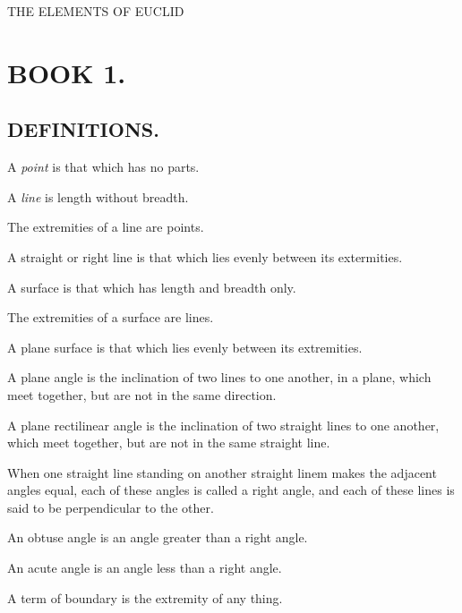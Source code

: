 		{
		\cleardoublepage%
		\let\clearpage\relax%
		{\hspace{48pt}\centering THE ELEMENTS OF EUCLID}%
		
		\chapter{BOOK 1.}\label{book1}
		}
		\pagestyle{euclidbasic}
		{\centering\section{DEFINITIONS.}
		\label{section\thesection}
		}
		\begin{bizarrelist}
			\item A \textit{point} is that which has no parts.\label{def1}
			\item A \textit{line} is length without breadth.\label{def2}
			\item The extremities of a line are points. \label{def3}
			\item A straight or right line is that which lies evenly between its extermities.  \label{def4}
			\item A surface is that which has length and breadth only.   \label{def5}
			\item The extremities of a surface are lines.   \label{def6}
			\item A plane surface is that which lies evenly between its extremities.    \label{def7}
			\item A plane angle is the inclination of two lines to one another, in a plane, which meet together, but are not in the same direction.     \label{def8}
			\item A plane rectilinear angle is the inclination of two straight lines to one another, which meet together, but are not in the same straight line.     \label{def9}
			\item When one straight line standing on another straight linem makes the adjacent angles equal, each of these angles is called a right angle, and each of these lines is said to be perpendicular to the other.      \label{def10}
			\item An obtuse angle is an angle greater than a right angle.      \label{def11}
			\item An acute angle is an angle less than a right angle.       \label{def12}
			\item A term of boundary is the extremity of any thing.        \label{def13}

\end{bizarrelist}
